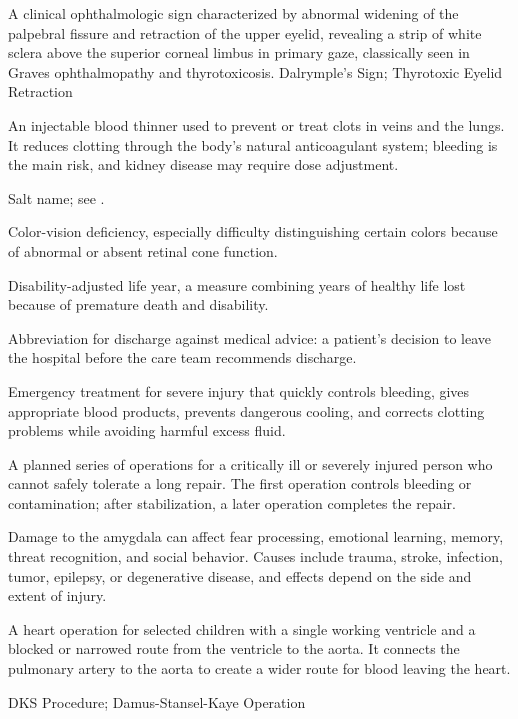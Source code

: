  A clinical ophthalmologic sign characterized by abnormal widening of the palpebral fissure and retraction of the upper eyelid, revealing a strip of white sclera above the superior corneal limbus in primary gaze, classically seen in Graves ophthalmopathy and thyrotoxicosis.
\synonyms
Dalrymple's Sign; Thyrotoxic Eyelid Retraction

 An injectable blood thinner used to prevent or treat clots in veins and the lungs. It reduces clotting through the body’s natural anticoagulant system; bleeding is the main risk, and kidney disease may require dose adjustment.

 Salt name; see .

 Color-vision deficiency, especially difficulty distinguishing certain colors because of abnormal or absent retinal cone function.

 Disability-adjusted life year, a measure combining years of healthy life lost because of premature death and disability.

 Abbreviation for discharge against medical advice: a patient's decision to leave the hospital before the care team recommends discharge.

 Emergency treatment for severe injury that quickly controls bleeding, gives appropriate blood products, prevents dangerous cooling, and corrects clotting problems while avoiding harmful excess fluid.

 A planned series of operations for a critically ill or severely injured person who cannot safely tolerate a long repair. The first operation controls bleeding or contamination; after stabilization, a later operation completes the repair.

 Damage to the amygdala can affect fear processing, emotional learning, memory, threat recognition, and social behavior. Causes include trauma, stroke, infection, tumor, epilepsy, or degenerative disease, and effects depend on the side and extent of injury.

 A heart operation for selected children with a single working ventricle and a blocked or narrowed route from the ventricle to the aorta. It connects the pulmonary artery to the aorta to create a wider route for blood leaving the heart.

\synonyms
DKS Procedure; Damus-Stansel-Kaye Operation

